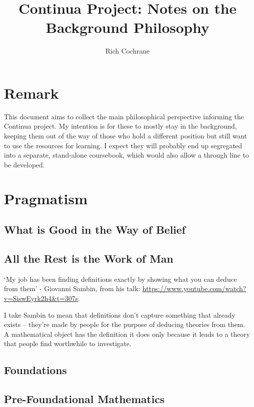 \documentclass[oneside,english]{amsbook}
\numberwithin{section}{chapter}
\theoremstyle{plain}
\theoremstyle{definition}
\begin{document}
	\title{Continua Project: Notes on the Background Philosophy}
	\author{Rich Cochrane}
	\maketitle
	
\chapter*{Remark}

This document aims to collect the main philosophical perspective informing the Continua project. My intention is for these to mostly stay in the background, keeping them out of the way of those who hold a different position but still want to use the resources for learning. I expect they will probably end up segregated into a separate, stand-alone coursebook, which would also allow a through line to be developed.

\chapter{Pragmatism}

\section{What is Good in the Way of Belief}

\section{All the Rest is the Work of Man}

`My job has been finding definitions exactly by showing what you can deduce from them' - Giovanni Sambin, from his talk: \url{https://www.youtube.com/watch?v=SiswEyrk2h4&t=307s}.

I take Sambin to mean that definitions don't capture something that already exists -- they're made by people for the purpose of deducing theories from them. A mathematical object has the definition it does only because it leads to a theory that people find worthwhile to investigate.




\section{Foundations}

\section{Pre-Foundational Mathematics}
\end{document}
